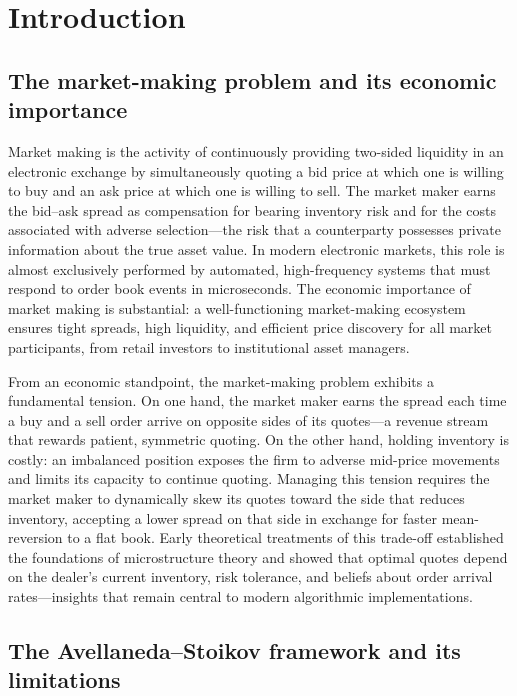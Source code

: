 \documentclass[11pt]{article}
\begin{document}
\section{Introduction}
\label{sec:intro}

\subsection{The market-making problem and its economic importance}

Market making is the activity of continuously providing two-sided
liquidity in an electronic exchange by simultaneously quoting a bid price
at which one is willing to buy and an ask price at which one is willing
to sell.
The market maker earns the bid--ask spread as compensation for bearing
inventory risk and for the costs associated with adverse selection---the
risk that a counterparty possesses private information about the true
asset value.
In modern electronic markets, this role is almost exclusively performed
by automated, high-frequency systems that must respond to order book
events in microseconds.
The economic importance of market making is substantial: a well-functioning
market-making ecosystem ensures tight spreads, high liquidity, and
efficient price discovery for all market participants, from retail
investors to institutional asset managers.

From an economic standpoint, the market-making problem exhibits a
fundamental tension.
On one hand, the market maker earns the spread each time a buy and a sell
order arrive on opposite sides of its quotes---a revenue stream that
rewards patient, symmetric quoting.
On the other hand, holding inventory is costly: an imbalanced position
exposes the firm to adverse mid-price movements and limits its capacity to
continue quoting.
Managing this tension requires the market maker to dynamically skew its
quotes toward the side that reduces inventory, accepting a lower spread
on that side in exchange for faster mean-reversion to a flat book.
Early theoretical treatments of this trade-off
\parencite{ho1981dealer,ohara1995microstructure} established the
foundations of microstructure theory and showed that optimal quotes depend
on the dealer's current inventory, risk tolerance, and beliefs about
order arrival rates---insights that remain central to modern algorithmic
implementations.

\subsection{The Avellaneda--Stoikov framework and its limitations}
\end{document}
